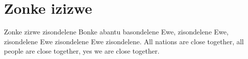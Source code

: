 \starttocol
\chapter{Zonke izizwe}
\nexttocol
\hfill{\it }
\stoptocol
\starttocol
\startlines
{\sc Zonke} zizwe zisondelene
Bonke abantu basondelene
Ewe, zisondelene
Ewe, zisondelene
Ewe zisondelene
Ewe zisondelene.
\stoplines
\nexttocol
\startlines
All nations are close 
\hfill together, 
all people are close 
\hfill together, 
yes we are close together.
\stoplines
\stoptocol
